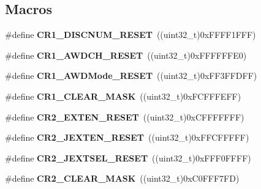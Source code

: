 \subsection*{Macros}
\begin{DoxyCompactItemize}
\item 
\hypertarget{group___a_d_c_gad932677d27cc1bb327c35adabfe2381f}{\#define {\bfseries C\-R1\-\_\-\-D\-I\-S\-C\-N\-U\-M\-\_\-\-R\-E\-S\-E\-T}~((uint32\-\_\-t)0x\-F\-F\-F\-F1\-F\-F\-F)}\label{group___a_d_c_gad932677d27cc1bb327c35adabfe2381f}

\item 
\hypertarget{group___a_d_c_ga7ad38f78fe4f6b0536c5a98c07c9bffe}{\#define {\bfseries C\-R1\-\_\-\-A\-W\-D\-C\-H\-\_\-\-R\-E\-S\-E\-T}~((uint32\-\_\-t)0x\-F\-F\-F\-F\-F\-F\-E0)}\label{group___a_d_c_ga7ad38f78fe4f6b0536c5a98c07c9bffe}

\item 
\hypertarget{group___a_d_c_ga8f64812f72e97a4bdd27684e20a79c39}{\#define {\bfseries C\-R1\-\_\-\-A\-W\-D\-Mode\-\_\-\-R\-E\-S\-E\-T}~((uint32\-\_\-t)0x\-F\-F3\-F\-F\-D\-F\-F)}\label{group___a_d_c_ga8f64812f72e97a4bdd27684e20a79c39}

\item 
\hypertarget{group___a_d_c_ga8d425258898b4af4ebc820f52635fad8}{\#define {\bfseries C\-R1\-\_\-\-C\-L\-E\-A\-R\-\_\-\-M\-A\-S\-K}~((uint32\-\_\-t)0x\-F\-C\-F\-F\-F\-E\-F\-F)}\label{group___a_d_c_ga8d425258898b4af4ebc820f52635fad8}

\item 
\hypertarget{group___a_d_c_ga4df1935a73fac1021d127cd06f33b840}{\#define {\bfseries C\-R2\-\_\-\-E\-X\-T\-E\-N\-\_\-\-R\-E\-S\-E\-T}~((uint32\-\_\-t)0x\-C\-F\-F\-F\-F\-F\-F\-F)}\label{group___a_d_c_ga4df1935a73fac1021d127cd06f33b840}

\item 
\hypertarget{group___a_d_c_gac33c62d66b5298288f0465c550e4891b}{\#define {\bfseries C\-R2\-\_\-\-J\-E\-X\-T\-E\-N\-\_\-\-R\-E\-S\-E\-T}~((uint32\-\_\-t)0x\-F\-F\-C\-F\-F\-F\-F\-F)}\label{group___a_d_c_gac33c62d66b5298288f0465c550e4891b}

\item 
\hypertarget{group___a_d_c_ga086e0cc4e32b2448cab2b5ba6d0651fb}{\#define {\bfseries C\-R2\-\_\-\-J\-E\-X\-T\-S\-E\-L\-\_\-\-R\-E\-S\-E\-T}~((uint32\-\_\-t)0x\-F\-F\-F0\-F\-F\-F\-F)}\label{group___a_d_c_ga086e0cc4e32b2448cab2b5ba6d0651fb}

\item 
\hypertarget{group___a_d_c_ga0ff3ffaedfe4137d35d9a975213a37a9}{\#define {\bfseries C\-R2\-\_\-\-C\-L\-E\-A\-R\-\_\-\-M\-A\-S\-K}~((uint32\-\_\-t)0x\-C0\-F\-F\-F7\-F\-D)}\label{group___a_d_c_ga0ff3ffaedfe4137d35d9a975213a37a9}


\end{DoxyCompactItemize}
